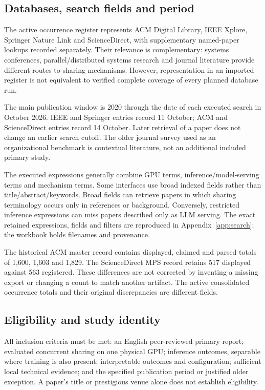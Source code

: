 \subsection{Databases, search fields and period}
The active occurrence register represents ACM Digital Library, IEEE Xplore, Springer Nature Link and ScienceDirect, with supplementary named-paper lookups recorded separately. Their relevance is complementary: systems conferences, parallel/distributed systems research and journal literature provide different routes to sharing mechanisms. However, representation in an imported register is not equivalent to verified complete coverage of every planned database run.

The main publication window is 2020 through the date of each executed search in October 2026. IEEE and Springer entries record 11 October; ACM and ScienceDirect entries record 14 October. Later retrieval of a paper does not change an earlier search cutoff. The older journal survey used as an organizational benchmark is contextual literature, not an additional included primary study.

The executed expressions generally combine GPU terms, inference/model-serving terms and mechanism terms. Some interfaces use broad indexed fields rather than title/abstract/keywords. Broad fields can retrieve papers in which sharing terminology occurs only in references or background. Conversely, restricted inference expressions can miss papers described only as LLM serving. The exact retained expressions, fields and filters are reproduced in Appendix~\ref{app:search}; the workbook holds filenames and provenance.

The historical ACM master record contains displayed, claimed and parsed totals of 1,600, 1,603 and 1,829. The ScienceDirect MPS record retains 517 displayed against 563 registered. These differences are not corrected by inventing a missing export or changing a count to match another artifact. The active consolidated occurrence totals and their original discrepancies are different fields.

\subsection{Eligibility and study identity}
All inclusion criteria must be met: an English peer-reviewed primary report; evaluated concurrent sharing on one physical GPU; inference outcomes, separable where training is also present; interpretable outcomes and configuration; sufficient local technical evidence; and the specified publication period or justified older exception. A paper's title or prestigious venue alone does not establish eligibility.

